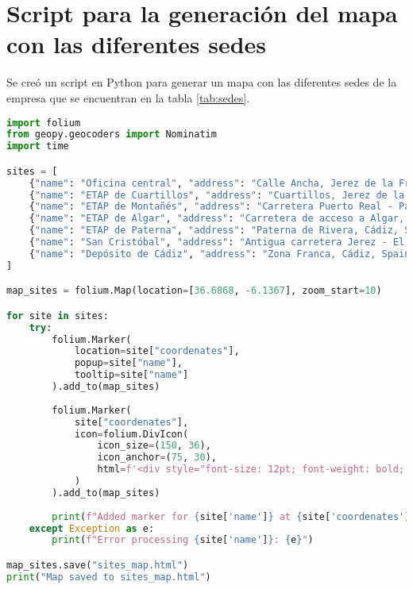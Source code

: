 \section{Script para la generación del mapa con las diferentes sedes}
\label{Apendice2:XXX}

Se creó un script en Python para generar un mapa con las diferentes sedes de la empresa que se encuentran en la tabla \ref{tab:sedes}.

\begin{lstlisting}[language=python, breaklines=true]
import folium
from geopy.geocoders import Nominatim
import time

sites = [
    {"name": "Oficina central", "address": "Calle Ancha, Jerez de la Frontera, Spain", "coordenates": [36.68830069473355, -6.141331723620025]},
    {"name": "ETAP de Cuartillos", "address": "Cuartillos, Jerez de la Frontera, Spain", "coordenates": [36.677837, -6.008313] },
    {"name": "ETAP de Montañés", "address": "Carretera Puerto Real - Paterna, Spain", "coordenates": [36.520725003331606, -6.043437235454119]},
    {"name": "ETAP de Algar", "address": "Carretera de acceso a Algar, Cádiz, Spain", "coordenates": [36.65415095709361, -5.643843877011512] },
    {"name": "ETAP de Paterna", "address": "Paterna de Rivera, Cádiz, Spain", "coordenates": [36.527809, -5.863061]},
    {"name": "San Cristóbal", "address": "Antigua carretera Jerez - El Puerto, Spain", "coordenates": [36.645474914003536, -6.126661833443614]},
    {"name": "Depósito de Cádiz", "address": "Zona Franca, Cádiz, Spain", "coordenates": [36.5059990355522, -6.265044690365919]}
]

map_sites = folium.Map(location=[36.6868, -6.1367], zoom_start=10)

for site in sites:
    try:
        folium.Marker(
            location=site["coordenates"],
            popup=site["name"],
            tooltip=site["name"]
        ).add_to(map_sites)
        
        folium.Marker(
            site["coordenates"],
            icon=folium.DivIcon(
                icon_size=(150, 36),
                icon_anchor=(75, 30),
                html=f'<div style="font-size: 12pt; font-weight: bold; text-align: center;">{site["name"]}</div>',
            )
        ).add_to(map_sites)
        
        print(f"Added marker for {site['name']} at {site['coordenates'][0]}, {site['coordenates'][1]}")
    except Exception as e:
        print(f"Error processing {site['name']}: {e}")

map_sites.save("sites_map.html")
print("Map saved to sites_map.html")
\end{lstlisting}
